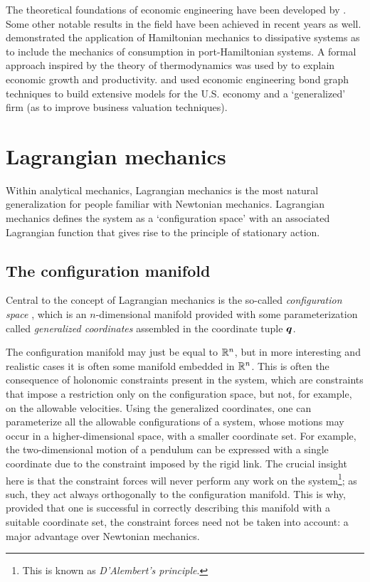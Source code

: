 The theoretical foundations of economic engineering have been developed by \citet{Mendel2019}. Some other notable results in the field have been achieved in recent years as well. \citet{Hutters2020b} demonstrated the application of Hamiltonian mechanics to dissipative systems as to include the mechanics of consumption in port-Hamiltonian systems. A formal approach inspired by the theory of thermodynamics was used by \citet{Manders2019} to explain economic growth and productivity. \citet{Kruimer2021} and \citet{VanArdenne2020} used economic engineering bond graph techniques to build extensive models for the U.S. economy and a `generalized' firm (as to improve business valuation techniques).

\section{Lagrangian mechanics}
\label{sec:lagrangian}
Within analytical mechanics, Lagrangian mechanics is the most natural generalization for people familiar with Newtonian mechanics. Lagrangian mechanics defines the system as a `configuration space' with an associated Lagrangian function that gives rise to the principle of stationary action.

\subsection{The configuration manifold}
Central to the concept of Lagrangian mechanics is the so-called \emph{configuration space} , which is an \(n\)-dimensional manifold provided with some parameterization called \emph{generalized coordinates} assembled in the coordinate tuple \(\vb*{q}\). 

The configuration manifold may just be equal to \(\mathbb{R}^n\), but in more interesting and realistic cases it is often some manifold embedded in \(\mathbb{R}^n\). This is often the consequence of holonomic constraints present in the system, which are constraints that impose a restriction only on the configuration space, but not, for example, on the allowable velocities.
Using the generalized coordinates, one can parameterize all the allowable configurations of a system, whose motions may occur in a higher-dimensional space, with a smaller coordinate set. For example, the two-dimensional motion of a pendulum can be expressed with a single coordinate due to the constraint imposed by the rigid link.  The crucial insight here is that the constraint forces will never perform any work on the system\footnote{This is known as \emph{D'Alembert's principle}.}; as such, they act always orthogonally to the configuration manifold. This is why, provided that one is successful in correctly describing this manifold with a suitable coordinate set, the constraint forces need not be taken into account: a  major advantage over Newtonian mechanics. 

